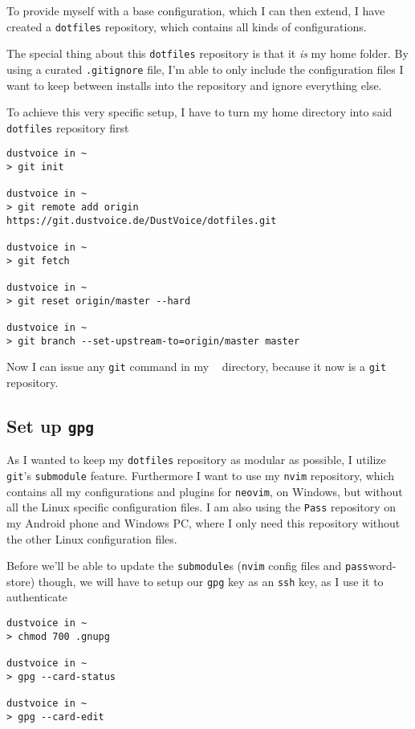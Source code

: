 \documentclass[10pt]{dustdoc}
\begin{document}
To provide myself with a base configuration, which I can then extend, I have created a \texttt{dotfiles} repository, which contains all kinds of configurations.

The special thing about this \texttt{dotfiles} repository is that it \emph{is} my home folder.
By using a curated \texttt{.gitignore} file, I’m able to only include the configuration files I want to keep between installs into the repository and ignore everything else.

To achieve this very specific setup, I have to turn my home directory into said \texttt{dotfiles} repository first

\begin{verbatim}
dustvoice in ~
> git init

dustvoice in ~
> git remote add origin https://git.dustvoice.de/DustVoice/dotfiles.git

dustvoice in ~
> git fetch

dustvoice in ~
> git reset origin/master --hard

dustvoice in ~
> git branch --set-upstream-to=origin/master master
\end{verbatim}

Now I can issue any \texttt{git} command in my \texttt{~} directory, because it now is a \texttt{git} repository.

\subsection{Set up \texttt{gpg}}%
\label{sec:set-up-gpg}

As I wanted to keep my \texttt{dotfiles} repository as modular as possible, I utilize \texttt{git}'s \texttt{submodule} feature.
Furthermore I want to use my \texttt{nvim} repository, which contains all my configurations and plugins for \texttt{neovim}, on Windows, but without all the Linux specific configuration files.
I am also using the \texttt{Pass} repository on my Android phone and Windows PC, where I only need this repository without the other Linux configuration files.

Before we’ll be able to update the \texttt{submodule}s (\texttt{nvim} config files and \texttt{pass}word-store) though, we will have to setup our \texttt{gpg} key as an \texttt{ssh} key, as I use it to authenticate

\begin{verbatim}
dustvoice in ~
> chmod 700 .gnupg

dustvoice in ~
> gpg --card-status

dustvoice in ~
> gpg --card-edit
\end{verbatim}
\end{document}
